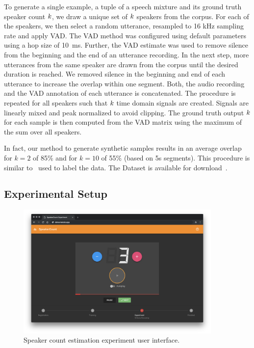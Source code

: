 \par
To generate a single example, a tuple of a speech mixture and its ground truth speaker count \(k \), we draw a unique set of \(k \) speakers from the corpus.
For each of the speakers, we then select a random utterance, resampled to 16 kHz sampling rate and apply VAD.\@
The VAD method was configured using default parameters using a hop size of 10~ms.
Further, the VAD estimate was used to remove silence from the beginning and the end of an utterance recording.
In the next step, more utterances from the same speaker are drawn from the corpus until the desired duration is reached.
We removed silence in the beginning and end of each utterance to increase the overlap within one segment.
Both, the audio recording and the VAD annotation of each utterance is concatenated.
The procedure is repeated for all speakers such that \(k \) time domain signals are created.
Signals are linearly mixed and peak normalized to avoid clipping.
The ground truth output \(k \) for each sample is then computed from the VAD matrix using the maximum of the sum over all speakers.
\par
In fact, our method to generate synthetic samples results in an average overlap for \(k=2\) of 85\% and for \(k=10\) of 55\% (based on 5s segments).
This procedure is similar to~\cite{mesaros17} used to label the data.
The Dataset is available for download~\cite{oss_libricount}.

\subsection{Experimental Setup}

\begin{figure}[htb]
    \centering
        \includegraphics[width=0.9\textwidth]{Chapters/07_Analysis_Experiment/figures/experiment_ui.png}
    \caption{Speaker count estimation experiment user interface.}
    \label{fig:user_interface_speaker}
\end{figure}

